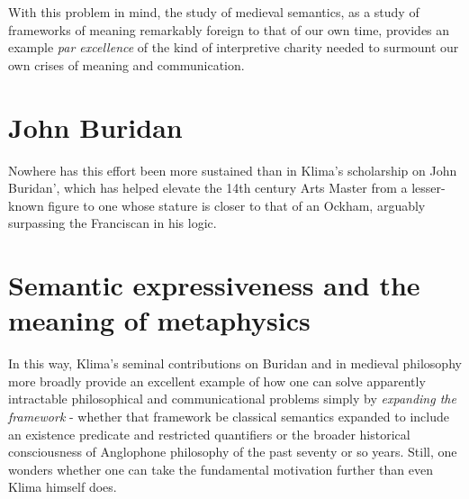 \documentclass[]{article}
\begin{document}
With this problem in mind, the study of medieval semantics, 
as a study of frameworks of meaning remarkably foreign to that of our own time, 
provides an example \emph{par excellence} of the kind of interpretive charity needed to surmount our own crises of meaning and communication. 
\section{John Buridan}
Nowhere has this effort been more sustained than in Klima's scholarship on John Buridan', 
which has helped elevate the 14th century Arts Master from a lesser-known figure to one whose stature is closer to that of an Ockham, 
arguably surpassing the Franciscan in his logic.

\section{Semantic expressiveness and the meaning of metaphysics}
In this way, 
Klima's seminal contributions on Buridan and in medieval philosophy more broadly provide an excellent example of how one can solve apparently intractable philosophical and communicational problems 
simply by \emph{expanding the framework}
 - whether that framework be classical semantics expanded to include an existence predicate and restricted quantifiers
 or the broader historical consciousness of Anglophone philosophy of the past seventy or so years. 
Still, one wonders whether one can take the fundamental motivation further than even Klima himself does. 
\end{document}
